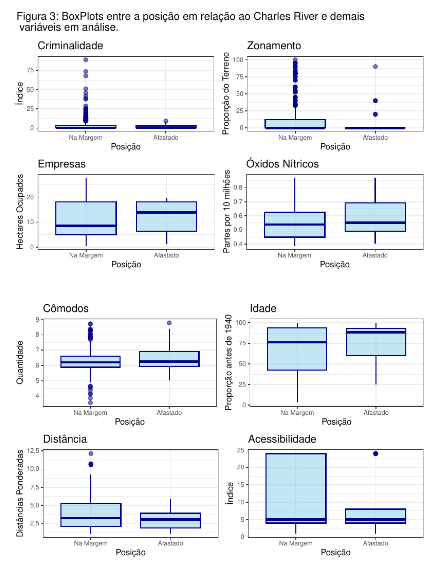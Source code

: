 \documentclass[
  letterpaper,
]{report}
\begin{document}
\begin{figure}[H]

{\centering \includegraphics{Parte-1_files/figure-pdf/unnamed-chunk-4-1.pdf}

}

\end{figure}

\begin{figure}[H]

{\centering \includegraphics{Parte-1_files/figure-pdf/unnamed-chunk-4-2.pdf}

}

\end{figure}
\end{document}
